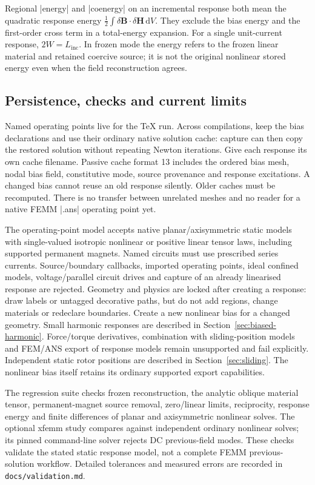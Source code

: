 Regional |energy| and |coenergy| on an incremental response both mean the
quadratic response energy $\tfrac12\int\delta\mathbf B\cdot
\delta\mathbf H\,\mathrm dV$. They exclude the bias energy and the first-order
cross term in a total-energy expansion. For a single unit-current response,
$2W=L_{\mathrm{inc}}$. In frozen mode the energy refers to the frozen linear
material and retained coercive source; it is not the original nonlinear
stored energy even when the field reconstruction agrees.

\subsection{Persistence, checks and current limits}
Named operating points live for the TeX run. Across compilations, keep the
bias declarations and use their ordinary native solution cache: capture can
then copy the restored solution without repeating Newton iterations. Give
each response its own cache filename. Passive cache format 13 includes the
ordered bias mesh, nodal bias field, constitutive mode, source provenance and
response excitations. A changed bias cannot reuse an old response silently.
Older caches must be recomputed. There is no transfer between unrelated meshes
and no reader for a native FEMM |.ans| operating point yet.

The operating-point model accepts native planar/axisymmetric static models with
single-valued isotropic nonlinear or positive linear tensor laws, including
supported permanent magnets. Named circuits must use prescribed series
currents. Source/boundary callbacks, imported operating points, ideal confined
models, voltage/parallel circuit drives and capture of an already linearised
response are rejected. Geometry and physics are locked after creating a
response: draw labels or untagged decorative paths, but do not add regions,
change materials or redeclare boundaries. Create a new nonlinear bias for a
changed geometry. Small harmonic responses are described in
Section~\ref{sec:biased-harmonic}. Force/torque derivatives, combination with
sliding-position models and FEM/ANS export of response models remain unsupported
and fail explicitly. Independent static rotor positions are described in
Section~\ref{sec:sliding}.
The nonlinear bias itself retains its ordinary supported export capabilities.

The regression suite checks frozen reconstruction, the analytic oblique
material tensor, permanent-magnet source removal, zero/linear limits,
reciprocity, response energy and finite differences of planar and
axisymmetric nonlinear solves. The optional xfemm study compares against
independent ordinary nonlinear solves; its pinned command-line solver rejects
DC previous-field modes. These checks validate the stated static response
model, not a complete FEMM previous-solution workflow. Detailed tolerances
and measured errors are recorded in \nolinkurl{docs/validation.md}.

